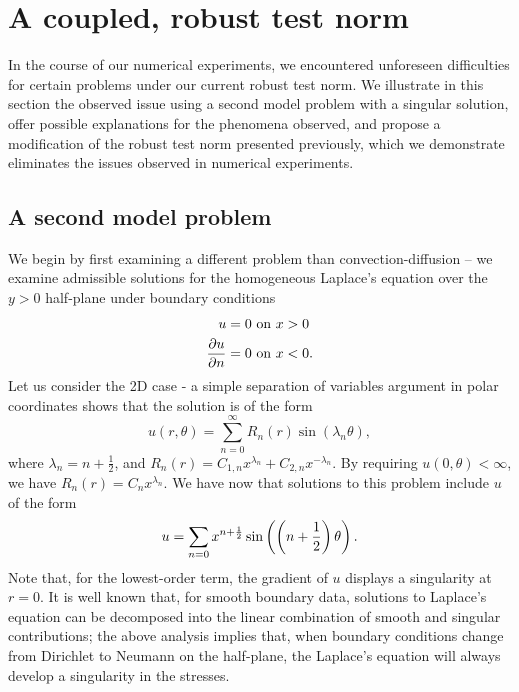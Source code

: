 \section{A coupled, robust test norm}

In the course of our numerical experiments, we encountered unforeseen difficulties for certain problems under our current robust test norm.  We illustrate in this section the observed issue using a second model problem with a singular solution, offer possible explanations for the phenomena observed, and propose a modification of the robust test norm presented previously, which we demonstrate eliminates the issues observed in numerical experiments.  

\subsection{A second model problem}
We begin by first examining a different problem than convection-diffusion -- we examine admissible solutions for the homogeneous Laplace's equation over the $y > 0$ half-plane under boundary conditions 
\begin{align*}
u &= 0 \text{ on } x > 0\\
\pd{u}{n} &= 0 \text{ on } x < 0.
\end{align*}
Let us consider the 2D case - a simple separation of variables argument in polar coordinates shows that the solution is of the form
\[
u(r,\theta) = \sum_{n=0}^\infty R_n(r) \sin(\lambda_n \theta),
\]
where $\lambda_n = n + \frac{1}{2}$, and $R_n(r) = C_{1,n}x^{\lambda_n} + C_{2,n}x^{-\lambda_n}$.  By requiring $u(0,\theta) < \infty$, we have $R_n(r) = C_n x^{\lambda_n}$.  We have now that solutions to this problem include $u$ of the form
\[
u = \sum_{n=0} x^{n+\frac{1}{2}} \sin\LRp{\LRp{n+\frac{1}{2}}\theta}.
\]
Note that, for the lowest-order term, the gradient of $u$ displays a singularity at $r = 0$.  It is well known that, for smooth boundary data, solutions to Laplace's equation can be decomposed into the linear combination of smooth and singular contributions; the above analysis implies that, when boundary conditions change from Dirichlet to Neumann on the half-plane, the Laplace's equation will always develop a singularity in the stresses.  

